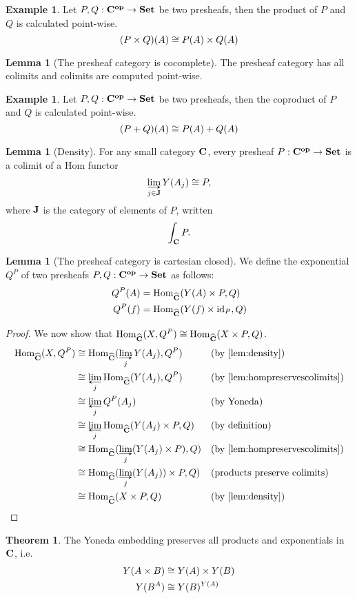 \documentclass{scrartcl}
\theoremstyle{definition}
\newtheorem{lemma}[definition]{Lemma}
\newtheorem{theorem}[definition]{Theorem}
\newtheorem{example}[definition]{Example}
\begin{document}
\begin{example}
  Let $P,Q: \mathbf{C}^{\mathbf{op}} \to \mathbf{Set}$ be two presheafs, then the product of $P$ and $Q$ is calculated point-wise.
  $$(P \times Q)(A) \cong P(A) \times Q(A)$$
\end{example}

\begin{lemma}[The presheaf category is cocomplete]
  The presheaf category has all colimits and colimits are computed point-wise.
\end{lemma}

\begin{example}
  Let $P,Q: \mathbf{C}^{\mathbf{op}} \to \mathbf{Set}$ be two presheafs, then the coproduct of $P$ and $Q$ is calculated point-wise.
  $$(P + Q)(A) \cong P(A) + Q(A)$$
\end{example}

\begin{lemma}[Density]
  \label{lem:density}
  For any small category $\mathbf{C}$, every presheaf $P: \mathbf{C}^{\mathbf{op}} \to \mathbf{Set}$ is a colimit of a Hom functor
  $$\colim{j \in \Cat{J}} Y(A_j) \iso P,$$ where $\mathbf{J}$ is the category of elements of $P$, written $$\int_{\mathbf{C}} P.$$
\end{lemma}

\begin{lemma}[The presheaf category is cartesian closed]
  We define the exponential $Q^P$ of two presheafs $P, Q: \mathbf{C}^{\mathbf{op}} \to \mathbf{Set}$ as follows:
  \begin{align*}
    Q^P(A) &= \mathrm{Hom}_{\widehat{\mathbf{C}}}(Y(A) \times P,Q) \\
    Q^P(f) &= \mathrm{Hom}_{\widehat{\mathbf{C}}}(Y(f) \times \mathrm{id}_P,Q)
  \end{align*}
\begin{proof}
  We now show that $\mathrm{Hom}_{\widehat{\mathbf{C}}}(X,Q^P) \cong \mathrm{Hom}_{\widehat{\mathbf{C}}}(X \times P,Q)$.
  \begin{align*}
    \Hom{\Presheaf{\Cat{C}}}{X}{Q^P}
      &\iso \Hom{\Presheaf{\Cat{C}}}{\colim{j}Y(A_j)}{Q^P} && \text{(by \autoref{lem:density})} \\
      &\iso \lim{j} \Hom{\Presheaf{\Cat{C}}}{Y(A_j)}{Q^P} && \text{(by \autoref{lem:hompreservescolimits})} \\
      &\iso \lim{j} Q^P(A_j) && \text{(by Yoneda)} \\
      &\iso \lim{j} \Hom{\Presheaf{\Cat{C}}}{Y(A_j) \times P}{Q} && \text{(by definition)} \\
      &\iso \Hom{\Presheaf{\Cat{C}}}{\colim{j}(Y(A_j) \times P)}{Q} && \text{(by \autoref{lem:hompreservescolimits})} \\
      &\iso \Hom{\Presheaf{\Cat{C}}}{\colim{j}(Y(A_j)) \times P}{Q} && \text{(products preserve colimits)} \\
      &\iso \Hom{\Presheaf{\Cat{C}}}{X \times P}{Q} && \text{(by \autoref{lem:density})}
  \end{align*}
\end{proof}
\end{lemma}

\begin{theorem} The Yoneda embedding preserves all products and exponentials in $\mathbf{C}$, i.e.
  \begin{align*}
    Y(A \times B) &\cong Y(A) \times Y(B) \\
    Y(B^A) &\cong Y(B)^{Y(A)}
  \end{align*}
\end{theorem}
\end{document}
